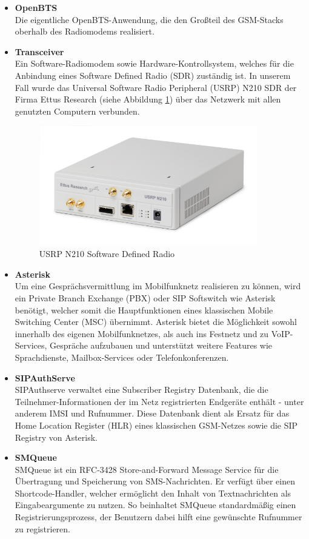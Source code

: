 \begin{itemize}
\item \textbf{OpenBTS}\\
Die eigentliche OpenBTS-Anwendung, die den Großteil des GSM-Stacks oberhalb des Radiomodems realisiert.

\item \textbf{Transceiver}\\
Ein Software-Radiomodem sowie Hardware-Kontrollsystem, welches für die Anbindung eines Software Defined Radio (SDR) zuständig ist. In unserem Fall wurde das Universal Software Radio Peripheral (USRP) N210 SDR  der Firma Ettus Research (siehe Abbildung \ref{fig:n210}) über das Netzwerk mit allen genutzten Computern verbunden.
\begin{figure}[htbp]
    \centering
    \includegraphics[width=0.90\textwidth]{includes/ettus_n210}
    \caption{USRP N210 Software Defined Radio}
	\label{fig:n210}
\end{figure}

\newpage
\item \textbf{Asterisk}\\
Um eine Gesprächsvermittlung im Mobilfunknetz realisieren zu können, wird ein Private Branch Exchange (PBX) oder SIP Softswitch wie Asterisk benötigt, welcher somit die Hauptfunktionen eines klassischen Mobile Switching Center (MSC) übernimmt. Asterisk bietet die Möglichkeit sowohl innerhalb des eigenen Mobilfunknetzes, als auch ins Festnetz und zu VoIP-Services, Gespräche aufzubauen und unterstützt weitere Features wie Sprachdienste, Mailbox-Services oder Telefonkonferenzen.

\item \textbf{SIPAuthServe}\\
SIPAuthserve verwaltet eine Subscriber Registry Datenbank, die die Teilnehmer-Informationen der im Netz registrierten Endgeräte enthält - unter anderem IMSI und Rufnummer. Diese Datenbank dient als Ersatz für das Home Location Register (HLR) eines klassischen GSM-Netzes sowie die SIP Registry von Asterisk.

\item \textbf{SMQueue}\\
SMQueue ist ein RFC-3428 Store-and-Forward Message Service für die Übertragung und Speicherung von SMS-Nachrichten. Er verfügt über einen Shortcode-Handler, welcher ermöglicht den Inhalt von Textnachrichten als Eingabeargumente zu nutzen. So beinhaltet SMQueue standardmäßig einen Registrierungsprozess, der Benutzern dabei hilft eine gewünschte Rufnummer zu registrieren.
\end{itemize}

